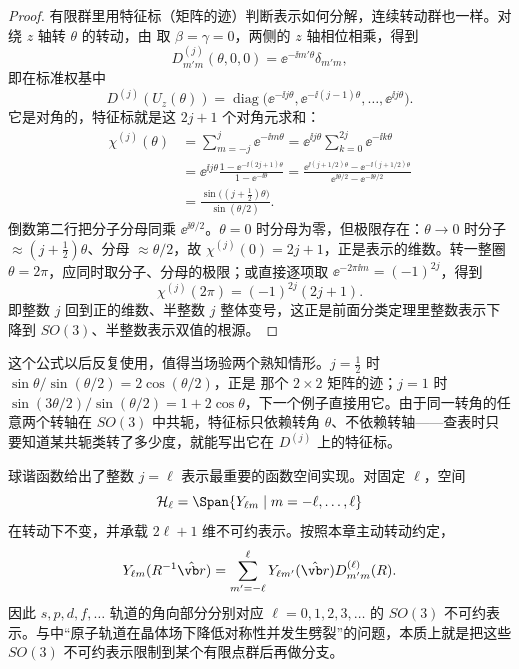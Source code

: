 \begin{proof}
有限群里用特征标（矩阵的迹）判断表示如何分解，连续转动群也一样。对绕 $z$ 轴转 $\theta$ 的转动，由  取 $\beta=\gamma=0$，两侧的 $z$ 轴相位相乘，得到
\[
D^{(j)}_{m'm}(\theta,0,0)=\ee^{-\ii m'\theta}\delta_{m'm},
\]
即在标准权基中
\[
D^{(j)}(U_z(\theta))=\operatorname{diag}\bigl(\ee^{-\ii j\theta},\ee^{-\ii(j-1)\theta},\dots,\ee^{\ii j\theta}\bigr).
\]
它是对角的，特征标就是这 $2j+1$ 个对角元求和：
\begin{align}
\chi^{(j)}(\theta)
&=\sum_{m=-j}^{j}\ee^{-\ii m\theta}
=\ee^{\ii j\theta}\sum_{k=0}^{2j}\ee^{-\ii k\theta}\nonumber\\
&=\ee^{\ii j\theta}\frac{1-\ee^{-\ii(2j+1)\theta}}{1-\ee^{-\ii\theta}}
=\frac{\ee^{\ii(j+1/2)\theta}-\ee^{-\ii(j+1/2)\theta}}
       {\ee^{\ii\theta/2}-\ee^{-\ii\theta/2}}\nonumber\\
&=\frac{\sin\bigl((j+\tfrac12)\theta\bigr)}{\sin(\theta/2)}.
\label{eq:so3-character-angle}
\end{align}
倒数第二行把分子分母同乘 $\ee^{\ii\theta/2}$。$\theta=0$ 时分母为零，但极限存在：$\theta\to0$ 时分子 $\approx(j+\tfrac12)\theta$、分母 $\approx\theta/2$，故 $\chi^{(j)}(0)=2j+1$，正是表示的维数。转一整圈 $\theta=2\pi$，应同时取分子、分母的极限；或直接逐项取 $\ee^{-2\pi\ii m}=(-1)^{2j}$，得到
\[
\chi^{(j)}(2\pi)=(-1)^{2j}(2j+1).
\]
即整数 $j$ 回到正的维数、半整数 $j$ 整体变号，这正是前面分类定理里整数表示下降到 $SO(3)$、半整数表示双值的根源。
\end{proof}


这个公式以后反复使用，值得当场验两个熟知情形。$j=\tfrac12$ 时 $\sin\theta/\sin(\theta/2)=2\cos(\theta/2)$，正是  那个 $2\times2$ 矩阵的迹；$j=1$ 时 $\sin(3\theta/2)/\sin(\theta/2)=1+2\cos\theta$，下一个例子直接用它。由于同一转角的任意两个转轴在 $SO(3)$ 中共轭，特征标只依赖转角 $\theta$、不依赖转轴——查表时只要知道某共轭类转了多少度，就能写出它在 $D^{(j)}$ 上的特征标。

球谐函数给出了整数 $j=\ell$ 表示最重要的函数空间实现。对固定 $\ell$，空间
\[
\mathcal H_\ell=\Span\{Y_{\ell m}\mid m=-\ell,\dots,\ell\}
\]
在转动下不变，并承载 $2\ell+1$ 维不可约表示。按照本章主动转动约定，
\begin{equation}
Y_{\ell m}(R^{-1}\hat{\vb r})
=\sum_{m'=-\ell}^{\ell}
Y_{\ell m'}(\hat{\vb r})
D^{(\ell)}_{m'm}(R).
\label{eq:spherical-harmonic-rotation}
\end{equation}
因此 $s,p,d,f,\dots$ 轨道的角向部分分别对应 $\ell=0,1,2,3,\dots$ 的 $SO(3)$ 不可约表示。与中“原子轨道在晶体场下降低对称性并发生劈裂”的问题，本质上就是把这些 $SO(3)$ 不可约表示限制到某个有限点群后再做分支。


